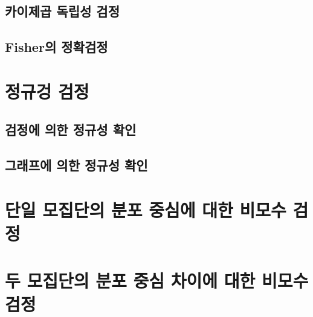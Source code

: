\documentclass[
]{book}
\begin{document}
\hypertarget{uxce74uxc774uxc81cuxacf1-uxb3c5uxb9bduxc131-uxac80uxc815}{%
\subsection{카이제곱 독립성 검정}\label{uxce74uxc774uxc81cuxacf1-uxb3c5uxb9bduxc131-uxac80uxc815}}

\hypertarget{fisheruxc758-uxc815uxd655uxac80uxc815}{%
\subsection{Fisher의 정확검정}\label{fisheruxc758-uxc815uxd655uxac80uxc815}}

\hypertarget{uxc815uxaddcuxac85-uxac80uxc815}{%
\section{정규겅 검정}\label{uxc815uxaddcuxac85-uxac80uxc815}}

\hypertarget{uxac80uxc815uxc5d0-uxc758uxd55c-uxc815uxaddcuxc131-uxd655uxc778}{%
\subsection{검정에 의한 정규성 확인}\label{uxac80uxc815uxc5d0-uxc758uxd55c-uxc815uxaddcuxc131-uxd655uxc778}}

\hypertarget{uxadf8uxb798uxd504uxc5d0-uxc758uxd55c-uxc815uxaddcuxc131-uxd655uxc778}{%
\subsection{그래프에 의한 정규성 확인}\label{uxadf8uxb798uxd504uxc5d0-uxc758uxd55c-uxc815uxaddcuxc131-uxd655uxc778}}

\hypertarget{uxb2e8uxc77c-uxbaa8uxc9d1uxb2e8uxc758-uxbd84uxd3ec-uxc911uxc2ecuxc5d0-uxb300uxd55c-uxbe44uxbaa8uxc218-uxac80uxc815}{%
\section{단일 모집단의 분포 중심에 대한 비모수 검정}\label{uxb2e8uxc77c-uxbaa8uxc9d1uxb2e8uxc758-uxbd84uxd3ec-uxc911uxc2ecuxc5d0-uxb300uxd55c-uxbe44uxbaa8uxc218-uxac80uxc815}}

\hypertarget{uxb450-uxbaa8uxc9d1uxb2e8uxc758-uxbd84uxd3ec-uxc911uxc2ec-uxcc28uxc774uxc5d0-uxb300uxd55c-uxbe44uxbaa8uxc218-uxac80uxc815}{%
\section{두 모집단의 분포 중심 차이에 대한 비모수 검정}\label{uxb450-uxbaa8uxc9d1uxb2e8uxc758-uxbd84uxd3ec-uxc911uxc2ec-uxcc28uxc774uxc5d0-uxb300uxd55c-uxbe44uxbaa8uxc218-uxac80uxc815}}
\end{document}
